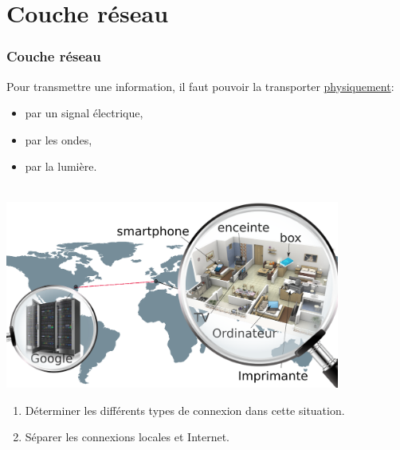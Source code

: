\documentclass[svgnames,11pt]{beamer}
\begin{document}
\section{Couche réseau}
\begin{frame}
    \frametitle{Couche réseau}

    \begin{aretenir}[]
    Pour transmettre une information, il faut pouvoir la transporter \underline{physiquement}:
    \begin{itemize}
        \item par un signal électrique,
        \item par les ondes,
        \item par la lumière.
    \end{itemize}
    \end{aretenir}

\end{frame}
\begin{frame}
    
\begin{activite}\\
    \includegraphics[width=11cm]{ressources/bonne-connexion.png}
\begin{enumerate}
    \item Déterminer les différents types de connexion dans cette situation.
    \item Séparer les connexions locales et Internet.
\end{enumerate}
\end{activite}
\end{frame}
\end{document}
